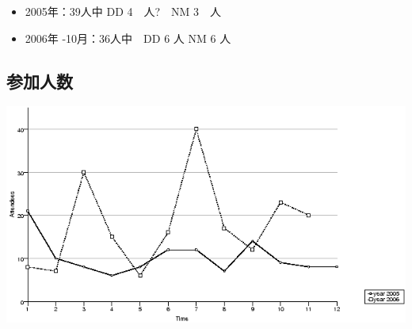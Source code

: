 \documentclass[mingoth,a4paper]{jsarticle}
\begin{document}
\begin{itemize}
 \item 2005年：39人中 DD 4　人?　NM 3　人
 \item 2006年 -10月：36人中　DD 6 人 NM 6 人
\end{itemize}

\subsection{参加人数}

\includegraphics[width=1\hsize]{image200612/people-chart.png}
\end{document}
